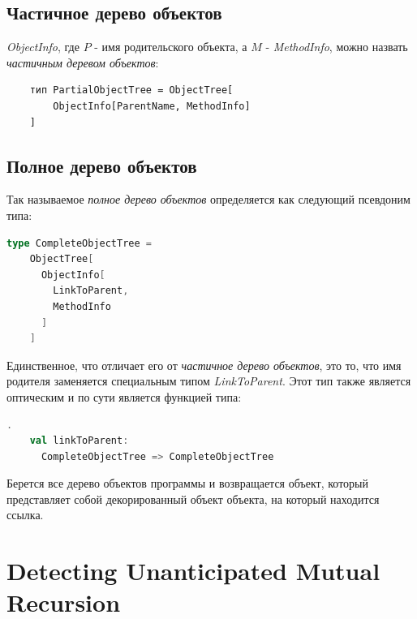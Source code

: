 \subsection{Частичное дерево объектов}
\textit{ObjectInfo}, где $P$ - имя родительского объекта, а $M$ - \textit{MethodInfo}, можно назвать \textit{частичным деревом объектов}:
\begin{lstlisting}
    тип PartialObjectTree = ObjectTree[
        ObjectInfo[ParentName, MethodInfo]
    ]

\end{lstlisting}

\subsection{Полное дерево объектов}
\label{impl:complete_object_tree}
Так называемое \textit{полное дерево объектов} определяется как следующий псевдоним типа:
\begin{lstlisting}[language=Scala]
  type CompleteObjectTree =
    ObjectTree[
      ObjectInfo[
        LinkToParent,
        MethodInfo
      ]
    ]
\end{lstlisting}
Единственное, что отличает его от \textit{частичное дерево объектов}, это то, что имя родителя заменяется специальным типом \textit{LinkToParent}. Этот тип также является оптическим \cite{optics} и по сути является функцией типа:
\begin{lstlisting}[language=Scala].
    val linkToParent: 
      CompleteObjectTree => CompleteObjectTree
\end{lstlisting}
Берется все дерево объектов программы и возвращается объект, который представляет собой декорированный объект объекта, на который находится ссылка.



\section{Detecting Unanticipated Mutual Recursion}
\label{impl:mutualrec}

